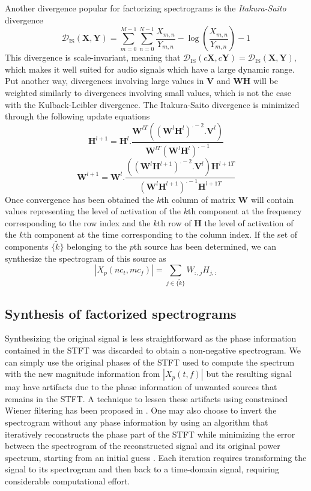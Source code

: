 Another divergence popular for factorizing spectrograms is the
\textit{Itakura-Saito} divergence 
\[
    \mathcal{D}_{\text{IS}}(\boldsymbol{X},\boldsymbol{Y}) =
    \sum_{m=0}^{M-1}\sum_{n=0}^{N-1} \frac{X_{m,n}}{Y_{m,n}}
    - \log \left(\frac{X_{m,n}}{Y_{m,n}}\right) -1
\]
This divergence is scale-invariant, meaning that
$\mathcal{D}_{\text{IS}}(c\boldsymbol{X},c\boldsymbol{Y})=\mathcal{D}_{\text{IS}}(\boldsymbol{X},\boldsymbol{Y})$,
which makes it well suited for audio signals which have a large dynamic range.
Put another way, divergences involving large values in $\boldsymbol{V}$ and
$\boldsymbol{W}\boldsymbol{H}$ will be weighted similarly to divergences
involving small values, which is not the case with the Kulback-Leibler
divergence.  The Itakura-Saito divergence is minimized through the following
update equations
\[
    \boldsymbol{H}^{l+1}
    =
    \boldsymbol{H}^{l}.
    \frac{\boldsymbol{W}^{lT}((\boldsymbol{W}^{l}\boldsymbol{H}^{l})^{.-2}.\boldsymbol{V}^{l})}
    {\boldsymbol{W}^{lT}(\boldsymbol{W}^{l}\boldsymbol{H}^{l})^{.-1}}
\]
\[
    \boldsymbol{W}^{l+1}
    =
    \boldsymbol{W}^{l}.
    \frac{((\boldsymbol{W}^{l}\boldsymbol{H}^{l+1})^{.-2}.\boldsymbol{V}^{l})\boldsymbol{H}^{l+1T}}
    {(\boldsymbol{W}^{l}\boldsymbol{H}^{l+1})^{.-1}\boldsymbol{H}^{l+1T}}
\]
Once convergence has been obtained the $k$th column of matrix $\boldsymbol{W}$ will contain
values representing the level of activation of the $k$th component at the
frequency corresponding to the row index and the $k$th row of $\boldsymbol{H}$ the level of
activation of the $k$th component at the time corresponding to the column index.
If the set of components $\{ \tilde{k} \}$ belonging to the $p$th source has
been determined, we can synthesize the spectrogram of this source as
\[
    |X_{p}(nc_{t},mc_{f})| =
    \sum_{j \in \{\tilde{k}\}}W_{:,j}H_{j,:}
\]
 
\subsection{Synthesis of factorized spectrograms}

Synthesizing the original signal is less straightforward as the phase
information contained in the STFT was discarded to obtain a non-negative
spectrogram. We can simply use the
original phases of the STFT used to compute the spectrum with the new magnitude
information from $|X_{p}(t,f)|$ but the resulting signal may have artifacts due to
the phase information of unwanted sources that remains in the STFT. A technique
to lessen these artifacts using constrained Wiener filtering has been proposed in
\cite{le2013consistent}. One may also choose to invert the spectrogram without
any phase information by using an algorithm that iteratively reconstructs the
phase part of the STFT while minimizing the error
between the spectrogram of the reconstructed signal and its original power
spectrum, starting from an initial guess \cite{griffin1984signal}. Each
iteration requires transforming the signal to its spectrogram and then back to
a time-domain signal, requiring considerable computational effort.

